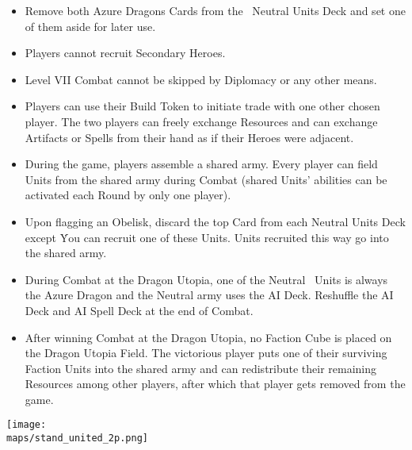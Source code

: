 \begin{multicols}{2}
\begin{itemize}
  \item Remove both Azure Dragons Cards from the \azure\ Neutral Units Deck and set one of them aside for later use.
  \item Players cannot recruit Secondary Heroes.
  \item Level VII Combat cannot be skipped by Diplomacy or any other means.
  \item Players can use their Build Token to initiate trade with one other chosen player. The two players can freely exchange Resources and can exchange Artifacts or Spells from their hand as if their Heroes were adjacent.
  \item During the game, players assemble a shared army. Every player can field Units from the shared army during Combat (shared Units'  abilities can be activated each Round by only one player).  %
  \item Upon flagging an Obelisk, discard the top Card from each Neutral Units Deck except \azure\. You can recruit one of these Units. Units recruited this way go into the shared army.
  \item During Combat at the Dragon Utopia, one of the Neutral \azure\ Units is always the Azure Dragon and the Neutral army uses the AI Deck. Reshuffle the AI Deck and AI Spell Deck at the end of Combat.
  \item After winning Combat at the Dragon Utopia, no Faction Cube is placed on the Dragon Utopia Field. The victorious player puts one of their surviving Faction Units into the shared army and can redistribute their remaining Resources among other players, after which that player gets removed from the game.
\end{itemize}

\columnbreak

\begin{center}
  \texttt{[image: \\maps/stand\_united\_2p.png]}
\end{center}

\vspace*{\fill}

\end{multicols}


